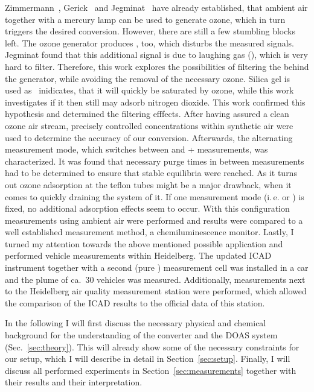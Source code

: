 Zimmermann~\cite{zimmermann}, Gerick~\cite{gerick} and
Jegminat~\cite{bsc} have already established, that ambient air
together with a mercury lamp can be used to generate ozone, which in
turn triggers the desired conversion. However, there are still a few
stumbling blocks left. The ozone generator produces , too,
which disturbs the measured  signals. Jegminat found that
this additional signal is due to laughing gas (), which is
very hard to filter. Therefore, this work explores the possibilities
of filtering the  behind the generator, while avoiding the
removal of the necessary ozone. Silica gel is used
as~\cite{ozone-silica} inidicates, that it will quickly be saturated
by ozone, while this work investigates if it then still may adsorb
nitrogen dioxide. This work confirmed this hypothesis and determined
the filtering efffects. After having assured a clean ozone air stream,
precisely controlled  concentrations within synthetic air were
used to determine the accuracy of our conversion. Afterwards, the
alternating measurement mode, which switches between  and
+ measurements, was characterized. It was found that
necessary purge times in between measurements had to be determined to
ensure that stable equilibria were reached. As it turns out ozone
adsorption at the teflon tubes might be a major drawback, when it
comes to quickly draining the system of it. If one measurement mode
(i.\,e.  or ) is fixed, no additional adsorption
effects seem to occur. With this configuration measurements using
ambient air were performed and results were compared to a well
established  measurement method, a chemiluminescence
monitor. Lastly, I turned my attention towards the above mentioned
possible application and performed vehicle measurements within
Heidelberg. The updated ICAD instrument together with a second (pure )
measurement cell was installed in a car and the plume of ca.~30 vehicles was
measured. Additionally, measurements next to the Heidelberg air
quality measurement station were performed, which allowed the
comparison of the ICAD results to the official data of this station.

In the following I will first discuss the necessary physical and
chemical background for the understanding of the converter and the
DOAS system (Sec.~\ref{sec:theory}). This will already show some of
the necessary constraints for our setup, which I will describe in
detail in Section~\ref{sec:setup}. Finally, I will discuss all
performed experiments in Section~\ref{sec:measurements} together with
their results and their interpretation.

